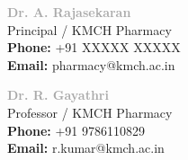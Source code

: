 \documentclass[10pt,a4paper]{article}
\begin{document}
\begin{minipage}[t]{0.58\textwidth}
    \begin{minipage}[t]{0.45\textwidth}
        \textbf{\textcolor{darkgray}{Dr. A. Rajasekaran}}\\[0.05cm]
        \textcolor{textgray}{Principal / KMCH Pharmacy}\\[0.15cm]
        {\scriptsize \textcolor{textgray}{\textbf{Phone:} +91 XXXXX XXXXX}}\\[0.05cm]
        {\scriptsize \textcolor{textgray}{\textbf{Email:} pharmacy@kmch.ac.in}}
    \end{minipage}
    \hfill
    \begin{minipage}[t]{0.45\textwidth}
        \textbf{\textcolor{darkgray}{Dr. R. Gayathri}}\\[0.05cm]
        \textcolor{textgray}{Professor / KMCH Pharmacy}\\[0.15cm]
        {\scriptsize \textcolor{textgray}{\textbf{Phone:} +91 9786110829}}\\[0.05cm]
        {\scriptsize \textcolor{textgray}{\textbf{Email:} r.kumar@kmch.ac.in}}
    \end{minipage}

\end{minipage}
\end{document}

